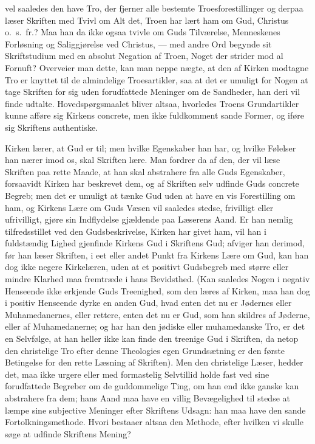 \documentclass[12pt]{book}
\newcommand{\opage}[1]{\marginnote{\footnotesize\textit{[#1]}}}
\begin{document}
vel saaledes den have Tro, der fjerner alle bestemte Troesforestillinger og
derpaa læser Skriften med Tvivl om Alt det, Troen har lært ham om Gud,
Christus o.~s.~fr.? Maa han da ikke ogsaa tvivle om Guds Tilværelse,
Menneskenes Forløsning og Saliggjørelse ved Christus, --- med andre Ord
begynde sit Skriftstudium med en absolut Negation af Troen, Noget der strider
mod al Fornuft? Overveier man dette, kan man neppe nægte, at den af Kirken
modtagne Tro er knyttet til de almindelige Troesartikler, saa at det er
umuligt for Nogen at tage Skriften for sig uden forudfattede Meninger om de
Sandheder, han deri vil finde udtalte. Hovedspørgsmaalet bliver altsaa,
hvorledes Troens Grundartikler kunne afføre sig Kirkens concrete, men ikke
fuldkomment sande Former, og iføre sig Skriftens authentiske.

Kirken lærer, at Gud er til; men hvilke Egenskaber han har, og hvilke Følelser
han nærer imod os, skal Skriften lære. Man fordrer da af den, der vil læse
Skriften paa rette Maade, at han skal abstrahere fra alle Guds Egenskaber,
forsaavidt Kirken har beskrevet dem, og af Skriften selv udfinde Guds concrete
Begreb; men det er umuligt at tænke Gud uden at have en vis Forestilling om
ham, og Kirkens Lære om Guds Væsen vil saaledes stedse, frivilligt eller
ufrivilligt, gjøre sin Indflydelse gjældende paa Læserens Aand.
\opage{108} Er han nemlig tilfredsstillet ved den Gudsbeskrivelse, Kirken har givet ham,
vil han i fuldstændig Lighed gjenfinde Kirkens Gud i Skriftens Gud; afviger
han derimod, før han læser Skriften, i eet eller andet Punkt fra Kirkens Lære
om Gud, kan han dog ikke negere Kirkelæren, uden at et positivt Gudsbegreb med
større eller mindre Klarhed maa fremtræde i hans Bevidsthed. (Kan saaledes
Nogen i negativ Henseende ikke erkjende Guds Treenighed, som den læres af
Kirken, maa han dog i positiv Henseende dyrke en anden Gud, hvad enten det nu
er Jødernes eller Muhamedanernes, eller rettere, enten det nu er Gud, som han
skildres af Jøderne, eller af Muhamedanerne; og har han den jødiske eller
muhamedanske Tro, er det en Selvfølge, at han heller ikke kan finde den
treenige Gud i Skriften, da netop den christelige Tro efter denne Theologies
egen Grundsætning er den første Betingelse for den rette Læsning af Skriften).
Men den christelige Læser, hedder det, maa ikke urgere eller med formastelig
Selvtillid holde fast ved sine forudfattede Begreber om de guddommelige Ting,
om han end ikke ganske kan abstrahere fra dem; hans Aand maa have en villig
Bevægelighed til stedse at læmpe sine subjective Meninger efter Skriftens
Udsagn: han maa have den sande Fortolkningsmethode. Hvori bestaaer altsaa den
Methode, efter hvilken vi skulle søge at udfinde Skriftens Mening?
\end{document}
